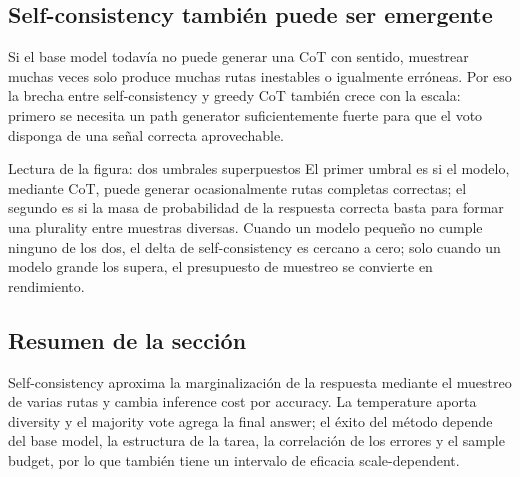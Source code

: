 
\subsection{Self-consistency también puede ser emergente}

Si el base model todavía no puede generar una CoT con sentido, muestrear muchas veces solo produce muchas rutas inestables o igualmente erróneas. Por eso la brecha entre self-consistency y greedy CoT también crece con la escala: primero se necesita un path generator suficientemente fuerte para que el voto disponga de una señal correcta aprovechable.


\begin{knowledgebox}{Lectura de la figura: dos umbrales superpuestos}
El primer umbral es si el modelo, mediante CoT, puede generar ocasionalmente rutas completas correctas; el segundo es si la masa de probabilidad de la respuesta correcta basta para formar una plurality entre muestras diversas. Cuando un modelo pequeño no cumple ninguno de los dos, el delta de self-consistency es cercano a cero; solo cuando un modelo grande los supera, el presupuesto de muestreo se convierte en rendimiento.
\end{knowledgebox}

\subsection{Resumen de la sección}

Self-consistency aproxima la marginalización de la respuesta mediante el muestreo de varias rutas y cambia inference cost por accuracy. La temperature aporta diversity y el majority vote agrega la final answer; el éxito del método depende del base model, la estructura de la tarea, la correlación de los errores y el sample budget, por lo que también tiene un intervalo de eficacia scale-dependent.
